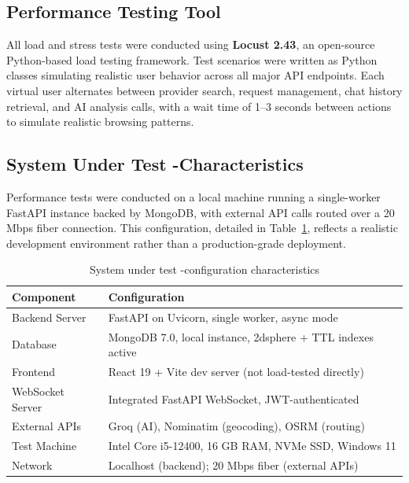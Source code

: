 \subsection{Performance Testing Tool}

All load and stress tests were conducted using \textbf{Locust 2.43}, an open-source Python-based load testing framework. Test scenarios were written as Python classes simulating realistic user behavior across all major API endpoints. Each virtual user alternates between provider search, request management, chat history retrieval, and AI analysis calls, with a wait time of 1--3 seconds between actions to simulate realistic browsing patterns.

\subsection{System Under Test -Characteristics}
Performance tests were conducted on a local machine running a single-worker FastAPI instance backed by MongoDB, with external API calls routed over a 20 Mbps fiber connection. This configuration, detailed in Table~\ref{tab:sut_config}, reflects a realistic development environment rather than a production-grade deployment.


\begin{table}[H]
\caption{System under test -configuration characteristics}
\centering
\renewcommand{\arraystretch}{1}
\begin{tabular}{|l|l|}
\hline
\rowcolor{cyan!20}
\textbf{Component} & \textbf{Configuration} \\
\hline
Backend Server & FastAPI on Uvicorn, single worker, async mode \\
\hline
Database & MongoDB 7.0, local instance, 2dsphere + TTL indexes active \\
\hline
Frontend & React 19 + Vite dev server (not load-tested directly) \\
\hline
WebSocket Server & Integrated FastAPI WebSocket, JWT-authenticated \\
\hline
External APIs & Groq (AI), Nominatim (geocoding), OSRM (routing) \\
\hline
Test Machine & Intel Core i5-12400, 16 GB RAM, NVMe SSD, Windows 11 \\
\hline
Network & Localhost (backend); 20 Mbps fiber (external APIs) \\
\hline
\end{tabular}

\label{tab:sut_config}
\end{table}

